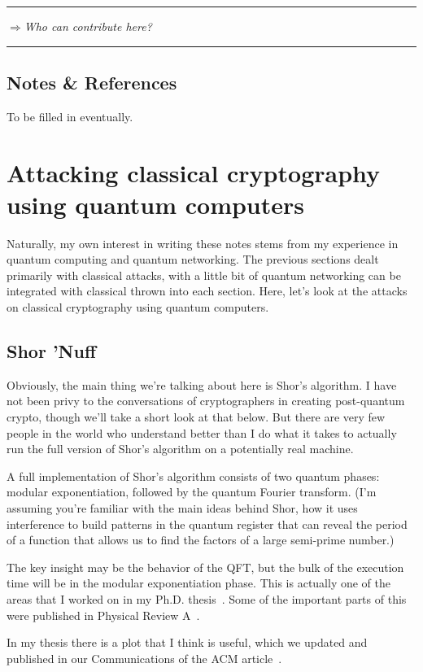 \documentclass[%
 aip,
 jmp,%
 amsmath,amssymb,
 reprint,%
]{revtex4-1}
\def\outlinecomment#1{\hrule{\color{Blue}$\Rightarrow${\small\em #1}}\hrule}
\begin{document}
\outlinecomment{Who can contribute here?}

\subsection{Notes \& References}

To be filled in eventually.

\section{Attacking classical cryptography using quantum computers}

Naturally, my own interest in writing these notes stems from my
experience in quantum computing and quantum networking.  The previous
sections dealt primarily with classical attacks, with a little bit of
quantum networking can be integrated with classical thrown into each
section.  Here, let's look at the attacks on classical cryptography
using quantum computers.

\subsection{Shor 'Nuff}

Obviously, the main thing we're talking about here is Shor's
algorithm.  I have not been privy to the conversations of
cryptographers in creating post-quantum crypto, though we'll take a
short look at that below.  But there are very few people in the world
who understand better than I do what it takes to actually run the full
version of Shor's algorithm on a potentially real machine.

A full implementation of Shor's algorithm consists of two quantum
phases: modular exponentiation, followed by the quantum Fourier
transform.  (I'm assuming you're familiar with the main ideas behind
Shor, how it uses interference to build patterns in the quantum
register that can reveal the period of a function that allows us to
find the factors of a large semi-prime number.)

The key insight may be the behavior of the QFT, but the bulk of the
execution time will be in the modular exponentiation phase.  This is
actually one of the areas that I worked on in my
Ph.D. thesis~\cite{van-meter06:thesis}.  Some of the important parts
of this were published in Physical Review
A~\cite{van-meter04:fast-modexp}.

In my thesis there is a plot that I think is useful, which we updated
and published in our Communications of the ACM article~\cite{van-meter13:_blueprint}.
\end{document}

